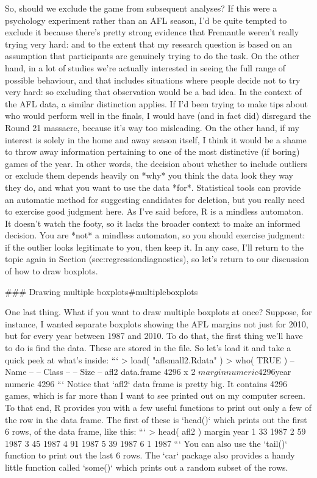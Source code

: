 So, should we exclude the game from subsequent analyses? If this were a psychology experiment rather than an AFL season, I'd be quite tempted to exclude it because there's pretty strong evidence that Fremantle weren't really trying very hard: and to the extent that my research question is based on an assumption that participants are genuinely trying to do the task. On the other hand, in a lot of studies we're actually interested in seeing the full range of possible behaviour, and that includes situations where people decide not to try very hard: so excluding that observation would be a bad idea. In the context of the AFL data, a similar distinction applies. If I'd been trying to make tips about who would perform well in the finals, I would have (and in fact did) disregard the Round 21 massacre, because it's way too misleading. On the other hand, if my interest is solely in the home and away season itself, I think it would be a shame to throw away information pertaining to one of the most distinctive (if boring) games of the year. In other words, the decision about whether to include outliers or exclude them depends heavily on *why* you think the data look they way they do, and what you want to use the data *for*. Statistical tools can provide an automatic method for suggesting candidates for deletion, but you really need to exercise good judgment here. As I've said before, R is a mindless automaton. It doesn't watch the footy, so it lacks the broader context to make an informed decision. You are *not* a mindless automaton, so you should exercise judgment: if the outlier looks legitimate to you, then keep it. In any case, I'll return to the topic again in Section \@ref(sec:regressiondiagnostics), so let's return to our discussion of how to draw boxplots.


### Drawing multiple boxplots{#multipleboxplots}

One last thing. What if you want to draw multiple boxplots at once? Suppose, for instance, I wanted separate boxplots showing the AFL margins not just for 2010, but for every year between 1987 and 2010. To do that, the first thing we'll have to do is find the data. These are stored in the  file. So let's load it and take a quick peek at what's inside:
```
> load( "aflsmall2.Rdata" )
> who( TRUE )
   -- Name --   -- Class --   -- Size --
   afl2         data.frame    4296 x 2  
    $margin     numeric       4296      
    $year       numeric       4296     
```
Notice that `afl2` data frame is pretty big. It contains 4296 games, which is far more than I want to see printed out on my computer screen. To that end, R provides you with a few useful functions to print out only a few of the row in the data frame. The first of these is `head()` which prints out the first 6 rows, of the data frame, like this:
```           
> head( afl2 )
  margin year
1     33 1987
2     59 1987
3     45 1987
4     91 1987
5     39 1987
6      1 1987
```
You can also use the `tail()` function to print out the last 6 rows. The `car` package also provides a handy little function called `some()` which prints out a random subset of the rows. 

